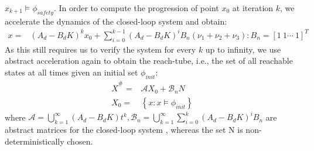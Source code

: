 \documentclass[runningheads,a4paper]{llncs}
\newcommand{\mat}[1]{\boldsymbol{#1}}
\begin{document}
\begin{enumerate}
$x_{k+1} \models \phi_{safety}$. %
  In order to compute the progression of point $x_0$ at iteration $k$,
  we accelerate the dynamics of the closed-loop system and obtain:
%
\begin{align}
x=&(A_d-B_dK)^kx_0
+\sum_{i=0}^{k-1} (A_d-B_dK)^i B_{n}(\nu_1+\nu_2+\nu_3) : B_n= [1\ 1 \cdots \ 1 ]^T
\end{align}
As this still requires us to verify the system for every $k$ up to infinity, 
we use abstract acceleration again to obtain
the reach-tube, i.e., the set of all reachable states at all times given an initial set $\phi_{init}$:
\begin{align}
\label{eq:aa_observer_LTI_cf}
\hat{X}^\#
=&\mathcal{A} X_0 + \mathcal{B}_{n} N\\
X_0 =&\left \{x : x \models \phi_{init} \right\}\nonumber
\end{align}
%
where $\mathcal{A}=\bigcup_{k=1}^\infty (A_d-B_dK)t^k, \mathcal{B}_{n}=\bigcup_{k=1}^\infty \sum_{i=0}^k(A_d-B_dK)^iB_{n}$ are abstract matrices for the closed-loop system \cite{cattaruzza2015unbounded}, whereas the set N is non-deterministically chosen.


\end{enumerate}
\end{document}
